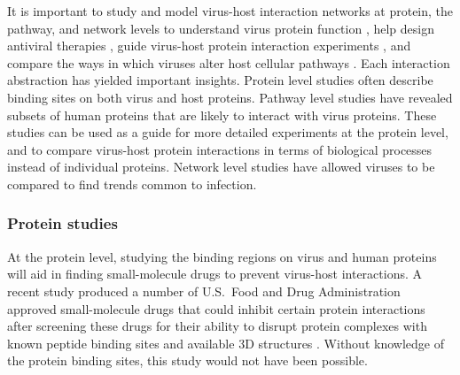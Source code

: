 It is important to study and model virus-host interaction networks at
protein, the pathway, and network levels to understand virus protein
function \cite{calderwood07}, help design antiviral therapies
\cite{brass08,dampier09}, guide virus-host protein interaction
experiments \cite{jansen2003bayesian,lee2004probabilistic}, and
compare the ways in which viruses alter host cellular pathways
\cite{navratil-system}. Each interaction abstraction has yielded
important insights. Protein level studies often describe binding sites
on both virus and host proteins. Pathway level studies have revealed
subsets of human proteins that are likely to interact with virus
proteins. These studies can be used as a guide for more detailed
experiments at the protein level, and to compare virus-host protein
interactions in terms of biological processes instead of individual
proteins. Network level studies have allowed viruses to be compared to
find trends common to infection.


\subsubsection{Protein studies}

At the protein level, studying the binding regions on virus and human
proteins will aid in finding small-molecule drugs to prevent
virus-host interactions. A recent study produced a number of
U.S.\ Food and Drug Administration approved small-molecule drugs that
could inhibit certain protein interactions after screening these drugs
for their ability to disrupt protein complexes with known peptide
binding sites and available 3D structures
\cite{parthasarathi2008approved}. Without knowledge of the protein
binding sites, this study would not have been possible.

